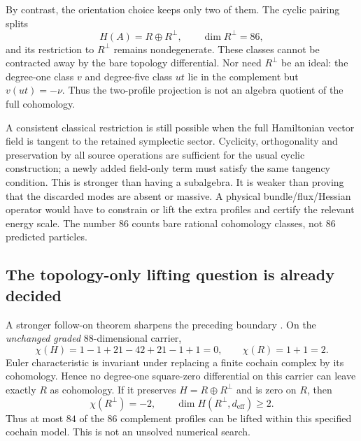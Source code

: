 \documentclass[11pt,a4paper]{article}
\begin{document}
By contrast, the orientation choice keeps only two of them. The cyclic
pairing splits
\[
 H(A)=R\oplus R^\perp,\qquad \dim R^\perp=86,
\]
and its restriction to \(R^\perp\) remains nondegenerate. These classes
cannot be contracted away by the bare topology differential. Nor need
\(R^\perp\) be an ideal: the degree-one class \(v\) and degree-five class
\(ut\) lie in the complement but \(v(ut)=-\nu\). Thus the two-profile
projection is not an algebra quotient of the full cohomology.

A consistent classical restriction is still possible when the full
Hamiltonian vector field is tangent to the retained symplectic sector.
Cyclicity, orthogonality and preservation by all source operations are
sufficient for the usual cyclic construction; a newly added field-only
term must satisfy the same tangency condition. This is stronger than
having a subalgebra. It is weaker than proving that the discarded modes
are absent or massive. A physical bundle/flux/Hessian operator would have
to constrain or lift the extra profiles and certify the relevant energy
scale. The number \(86\) counts bare rational cohomology classes, not
86 predicted particles.

\subsection{The topology-only lifting question is already decided}
\label{sec:bv-euler-lifting}

A stronger follow-on theorem sharpens the preceding boundary
\cite{PreprojectionTopologyLifting2026}. On the \emph{unchanged graded}
88-dimensional carrier,
\[
 \chi(H)=1-1+21-42+21-1+1=0,\qquad
 \chi(R)=1+1=2.
\]
Euler characteristic is invariant under replacing a finite cochain complex
by its cohomology. Hence no degree-one square-zero differential on this
carrier can leave exactly \(R\) as cohomology. If it preserves
\(H=R\oplus R^\perp\) and is zero on \(R\), then
\[
 \chi(R^\perp)=-2,\qquad
 \dim H(R^\perp,d_{\mathrm{eff}})\geq2.
\]
Thus at most \(84\) of the \(86\) complement profiles can be lifted within
this specified cochain model. This is not an unsolved numerical search.
\end{document}
